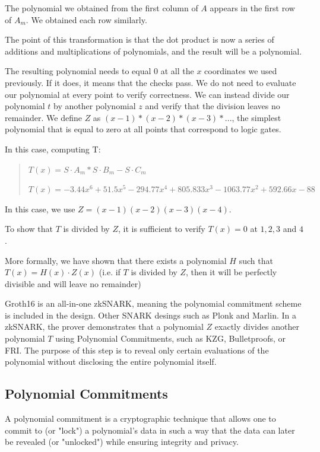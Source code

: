 The polynomial we obtained from the first column of $A$ appears in the first row of $A_m$. We obtained each row similarly.

The point of this transformation is that the dot product is now a series of additions and multiplications of polynomials, and the result will be a polynomial.

The resulting polynomial needs to equal $0$ at all the $x$ coordinates we used previously.
If it does, it means that the checks pass.
We do not need to evaluate our polynomial at every point to verify correctness. 
We can instead divide our polynomial $t$ by another polynomial $z$ and verify that the division leaves no remainder.
We define $Z$ as $(x - 1) * (x - 2) * (x - 3) * ...$, the simplest polynomial that is equal to zero at all points that correspond to logic gates. 

In this case, computing T:
\begin{quote}
$T(x) = S \cdot A_m * S \cdot B_m - S \cdot C_m  $

$T(x) = -3.44x^6 + 51.5x^5 - 294.77x^4 + 805.833x^3 - 1063.77x^2 + 592.66x - 88$
\end{quote}

In this case, we use $Z = (x-1)(x-2)(x-3)(x-4)$.

To show that $T$ is divided by $Z$, it is sufficient to verify $T(x) = 0$ at $1,2,3$ and $4$.

More formally, we have shown that there exists a polynomial $H$ such that $T(x)=H(x) \cdot Z(x)$
(i.e. if $T$ is divided by $Z$, then it will be perfectly divisible and will leave no remainder)


Groth16 is an all-in-one zkSNARK, meaning the polynomial commitment scheme is included in the design. Other SNARK desings such as Plonk and Marlin.
In a zkSNARK, the prover demonstrates that a polynomial $Z$ exactly divides another polynomial
$T$ using Polynomial Commitments, such as KZG, Bulletproofs, or FRI. 
The purpose of this step is to reveal only certain evaluations of the polynomial without disclosing the entire polynomial itself.\cite{VB16}


\subsection{Polynomial Commitments}
\label{subsec:pc}
A polynomial commitment is a cryptographic technique that allows one to commit to (or "lock") a polynomial's data 
in such a way that the data can later be revealed (or "unlocked") while ensuring integrity and privacy.

